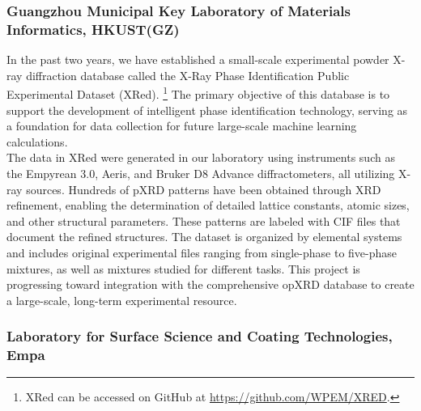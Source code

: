 \subsubsection*{Guangzhou Municipal Key Laboratory of Materials Informatics, HKUST(GZ)}


In the past two years, we have established a small-scale experimental powder X-ray diffraction database called the X-Ray Phase Identification Public Experimental Dataset (XRed). \footnote{XRed can be accessed on GitHub at \url{https://github.com/WPEM/XRED}.} The primary objective of this database is to support the development of intelligent phase identification technology, serving as a foundation for data collection for future large-scale machine learning calculations. \\

The data in XRed were generated in our laboratory using instruments such as the Empyrean 3.0, Aeris, and Bruker D8 Advance diffractometers, all utilizing  X-ray sources. Hundreds of pXRD patterns have been obtained through XRD refinement, enabling the determination of detailed lattice constants, atomic sizes, and other structural parameters. These patterns are labeled with CIF files that document the refined structures. The dataset is organized by elemental systems and includes original experimental files ranging from single-phase to five-phase mixtures, as well as mixtures studied for different tasks. This project is progressing toward integration with the comprehensive opXRD database to create a large-scale, long-term experimental resource.

\subsubsection*{Laboratory for Surface Science and Coating Technologies, Empa}

